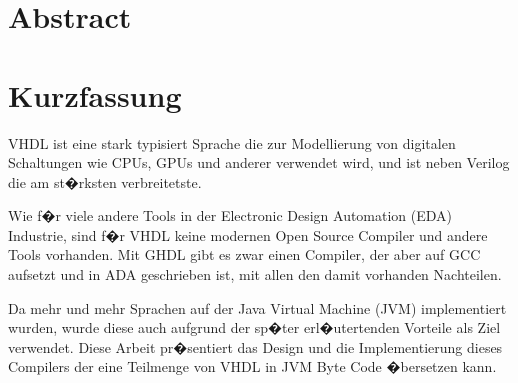 \chapter*{Abstract}

\chapter*{Kurzfassung}
VHDL ist eine stark typisiert Sprache die zur Modellierung von digitalen Schaltungen wie CPUs, GPUs und
anderer verwendet wird, und ist neben Verilog die am st�rksten verbreitetste.

Wie f�r viele andere Tools in der Electronic Design Automation (EDA)  Industrie, sind f�r VHDL keine modernen Open Source Compiler und andere Tools vorhanden. Mit GHDL  gibt es zwar einen Compiler, der aber auf GCC aufsetzt und in ADA geschrieben ist, mit allen den damit vorhanden Nachteilen. 

Da mehr und mehr Sprachen auf der Java Virtual Machine (JVM) implementiert wurden, wurde diese auch aufgrund der sp�ter erl�utertenden Vorteile als Ziel verwendet. Diese Arbeit pr�sentiert das Design und die Implementierung dieses Compilers der eine Teilmenge von VHDL in JVM Byte Code �bersetzen kann.
